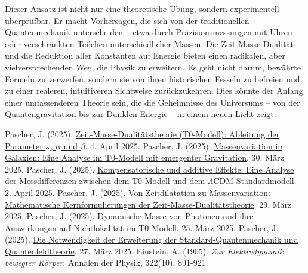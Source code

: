 \documentclass[a4paper,12pt]{article}
\begin{document}
	Dieser Ansatz ist nicht nur eine theoretische Übung, sondern experimentell überprüfbar. Er macht Vorhersagen, die sich von der traditionellen Quantenmechanik unterscheiden – etwa durch Präzisionsmessungen mit Uhren oder verschränkten Teilchen unterschiedlicher Massen. Die Zeit-Masse-Dualität und die Reduktion aller Konstanten auf Energie bieten einen radikalen, aber vielversprechenden Weg, die Physik zu erweitern. Es geht nicht darum, bewährte Formeln zu verwerfen, sondern sie von ihren historischen Fesseln zu befreien und zu einer realeren, intuitiveren Sichtweise zurückzukehren. Dies könnte der Anfang einer umfassenderen Theorie sein, die die Geheimnisse des Universums – von der Quantengravitation bis zur Dunklen Energie – in einem neuen Licht zeigt.
	
	\begin{thebibliography}{99}
		 Pascher, J. (2025). \href{https://github.com/jpascher/T0-Time-Mass-Duality/tree/main/2/pdf/Deutsch/Zeit-Masse-Dualitätstheorie (T0-Modell) Herleitung der Parameter kappa, alpha und beta.pdf}{Zeit-Masse-Dualitätstheorie (T0-Modell): Ableitung der Parameter \(\kappa\), \(\alpha\) und \(\beta\)}. 4. April 2025.
		 Pascher, J. (2025). \href{https://github.com/jpascher/T0-Time-Mass-Duality/tree/main/2/pdf/Deutsch/Massenvariation in Galaxien.pdf}{Massenvariation in Galaxien: Eine Analyse im T0-Modell mit emergenter Gravitation}. 30. März 2025.
		 Pascher, J. (2025). \href{https://github.com/jpascher/T0-Time-Mass-Duality/tree/main/2/pdf/Deutsch/Analyse der Messdifferenzen zwischen dem T0-Modell und dem Standardmodell.pdf}{Kompensatorische und additive Effekte: Eine Analyse der Messdifferenzen zwischen dem T0-Modell und dem \(\Lambda\)CDM-Standardmodell}. 2. April 2025.
		 Pascher, J. (2025). \href{https://github.com/jpascher/T0-Time-Mass-Duality/tree/main/2/pdf/Deutsch/Mathematische Formulierungen der Zeit-Masse-Dualitätstheorie mit Lagrange.pdf}{Von Zeitdilatation zu Massenvariation: Mathematische Kernformulierungen der Zeit-Masse-Dualitätstheorie}. 29. März 2025.
		 Pascher, J. (2025). \href{https://github.com/jpascher/T0-Time-Mass-Duality/tree/main/2/pdf/Deutsch/Dynamische Masse von Photonen und ihre Implikationen für Nichtlokalität.tex}{Dynamische Masse von Photonen und ihre Auswirkungen auf Nichtlokalität im T0-Modell}. 25. März 2025.
		 Pascher, J. (2025). \href{https://github.com/jpascher/T0-Time-Mass-Duality/tree/main/2/pdf/Deutsch/Die Notwendigkeit einer Erweiterung der Standard-Quantenmechanik und Quantenfeldtheorie.pdf}{Die Notwendigkeit der Erweiterung der Standard-Quantenmechanik und Quantenfeldtheorie}. 27. März 2025.
		 Einstein, A. (1905). \textit{Zur Elektrodynamik bewegter Körper}. Annalen der Physik, 322(10), 891-921.
	\end{thebibliography}
	
\end{document}
